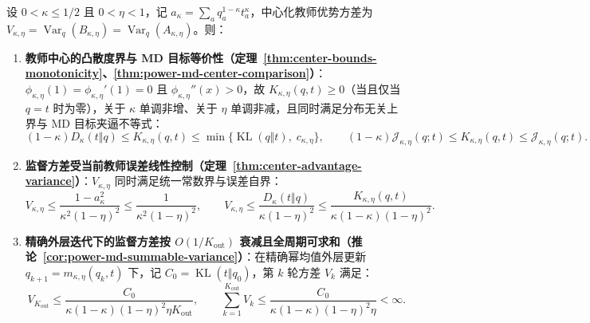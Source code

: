 \documentclass[lang=cn,scheme=chinese,openany]{../book/elegantbook}
\newcommand{\KL}{\operatorname{KL}}
\newcommand{\Var}{\operatorname{Var}}
\begin{document}
\begin{theorem}
\label{thm:center-bounds-monotonicity}
\label{thm:center-advantage-variance}
\label{thm:power-md-center-comparison}
\label{cor:power-md-summable-variance}
设 $0<\kappa\le 1/2$ 且 $0<\eta<1$，记 $a_\kappa=\sum_a q_a^{1-\kappa}t_a^\kappa$，中心化教师优势方差为 $V_{\kappa,\eta}=\Var_q(B_{\kappa,\eta})=\Var_q(A_{\kappa,\eta})$。则：
\begin{enumerate}
\item \textbf{教师中心的凸散度界与 MD 目标等价性（定理~\ref{thm:center-bounds-monotonicity}、\ref{thm:power-md-center-comparison}）}：$\phi_{\kappa,\eta}(1)=\phi_{\kappa,\eta}'(1)=0$ 且 $\phi_{\kappa,\eta}''(x)>0$，故 $K_{\kappa,\eta}(q,t)\ge 0$（当且仅当 $q=t$ 时为零），关于 $\kappa$ 单调非增、关于 $\eta$ 单调非减，且同时满足分布无关上界与 MD 目标夹逼不等式：
\begin{equation}
 (1-\kappa)D_\kappa(t\Vert q)\le K_{\kappa,\eta}(q,t)\le\min\bigl\{\KL(q\Vert t),\; c_{\kappa,\eta}\bigr\},
 \qquad
 (1-\kappa)\mathcal J_{\kappa,\eta}(q;t)\le K_{\kappa,\eta}(q,t)\le\mathcal J_{\kappa,\eta}(q;t).
 \label{eq:center-uniform-cap}
\end{equation}
\item \textbf{监督方差受当前教师误差线性控制（定理~\ref{thm:center-advantage-variance}）}：$V_{\kappa,\eta}$ 同时满足统一常数界与误差自界：
\begin{equation}
 V_{\kappa,\eta}
 \le\frac{1-a_\kappa^2}{\kappa^2(1-\eta)^2}
 \le\frac1{\kappa^2(1-\eta)^2},
 \qquad
 \boxed{V_{\kappa,\eta}
 \le\frac{D_\kappa(t\Vert q)}{\kappa(1-\eta)^2}
 \le\frac{K_{\kappa,\eta}(q,t)}{\kappa(1-\kappa)(1-\eta)^2}.}
 \label{eq:center-error-scaled-variance}
\end{equation}
\item \textbf{精确外层迭代下的监督方差按 $O(1/K_{\mathrm{out}})$ 衰减且全周期可求和（推论~\ref{cor:power-md-summable-variance}）}：在精确幂均值外层更新 $q_{k+1}=m_{\kappa,\eta}(q_k,t)$ 下，记 $C_0=\KL(t\Vert q_0)$，第 $k$ 轮方差 $V_k$ 满足：
\begin{equation}
 V_{K_{\mathrm{out}}}\le\frac{C_0}{\kappa(1-\kappa)(1-\eta)^2\eta K_{\mathrm{out}}},
 \qquad
 \sum_{k=1}^{K_{\mathrm{out}}} V_k\le\frac{C_0}{\kappa(1-\kappa)(1-\eta)^2\eta}<\infty.
 \label{eq:power-md-summable-variance}
\end{equation}
\end{enumerate}
\end{theorem}
\end{document}
